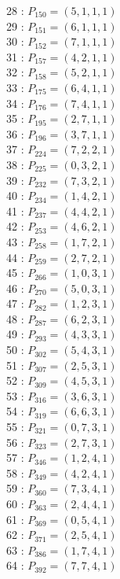 \documentclass{article}
\begin{document}
{\begin{multicols}{3}
28 : $P_{150}=( 5, 1, 1, 1 )$\\
29 : $P_{151}=( 6, 1, 1, 1 )$\\
30 : $P_{152}=( 7, 1, 1, 1 )$\\
31 : $P_{157}=( 4, 2, 1, 1 )$\\
32 : $P_{158}=( 5, 2, 1, 1 )$\\
33 : $P_{175}=( 6, 4, 1, 1 )$\\
34 : $P_{176}=( 7, 4, 1, 1 )$\\
35 : $P_{195}=( 2, 7, 1, 1 )$\\
36 : $P_{196}=( 3, 7, 1, 1 )$\\
37 : $P_{224}=( 7, 2, 2, 1 )$\\
38 : $P_{225}=( 0, 3, 2, 1 )$\\
39 : $P_{232}=( 7, 3, 2, 1 )$\\
40 : $P_{234}=( 1, 4, 2, 1 )$\\
41 : $P_{237}=( 4, 4, 2, 1 )$\\
42 : $P_{253}=( 4, 6, 2, 1 )$\\
43 : $P_{258}=( 1, 7, 2, 1 )$\\
44 : $P_{259}=( 2, 7, 2, 1 )$\\
45 : $P_{266}=( 1, 0, 3, 1 )$\\
46 : $P_{270}=( 5, 0, 3, 1 )$\\
47 : $P_{282}=( 1, 2, 3, 1 )$\\
48 : $P_{287}=( 6, 2, 3, 1 )$\\
49 : $P_{293}=( 4, 3, 3, 1 )$\\
50 : $P_{302}=( 5, 4, 3, 1 )$\\
51 : $P_{307}=( 2, 5, 3, 1 )$\\
52 : $P_{309}=( 4, 5, 3, 1 )$\\
53 : $P_{316}=( 3, 6, 3, 1 )$\\
54 : $P_{319}=( 6, 6, 3, 1 )$\\
55 : $P_{321}=( 0, 7, 3, 1 )$\\
56 : $P_{323}=( 2, 7, 3, 1 )$\\
57 : $P_{346}=( 1, 2, 4, 1 )$\\
58 : $P_{349}=( 4, 2, 4, 1 )$\\
59 : $P_{360}=( 7, 3, 4, 1 )$\\
60 : $P_{363}=( 2, 4, 4, 1 )$\\
61 : $P_{369}=( 0, 5, 4, 1 )$\\
62 : $P_{371}=( 2, 5, 4, 1 )$\\
63 : $P_{386}=( 1, 7, 4, 1 )$\\
64 : $P_{392}=( 7, 7, 4, 1 )$\\

\end{multicols}}
\end{document}

